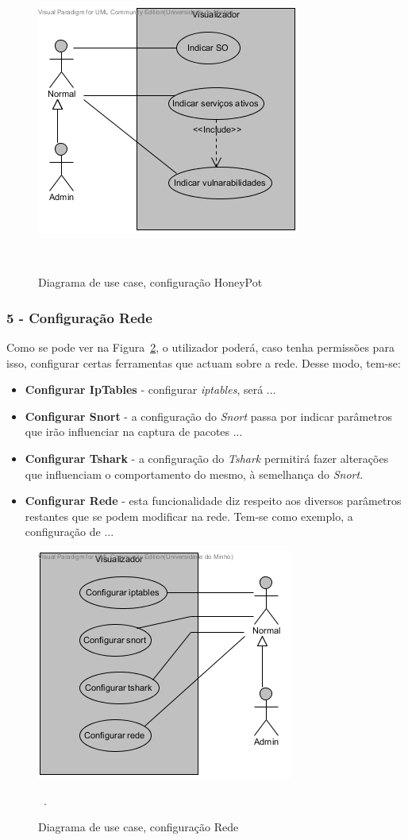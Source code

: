 \begin{figure}[!ht]
	\centering
	\includegraphics[scale=0.80]{images/ucs/ConfHoneyPot}
	\caption {Diagrama de use case, configuração HoneyPot}~\label{fig: confighoney}
\end{figure}
\pagebreak

\subsubsection{\textbf{5 - Configuração Rede}}
Como se pode ver na Figura~\ref{fig: confrede}, o utilizador poderá, caso tenha permissões para isso, configurar certas ferramentas que actuam sobre a rede. Desse modo, tem-se:

\begin{itemize}
 \item \textbf{Configurar IpTables} - configurar \emph{iptables}, será ...
 \item \textbf{Configurar Snort} - a configuração do \emph{Snort} passa por indicar parâmetros que irão influenciar na captura de pacotes ...
 \item \textbf{Configurar Tshark} - a configuração do \emph{Tshark} permitirá fazer alterações que influenciam o comportamento do mesmo, à semelhança do \emph{Snort}.
 \item \textbf{Configurar Rede} - esta funcionalidade diz respeito aos diversos parâmetros restantes que se podem modificar na rede. Tem-se como exemplo, a configuração de ...
\end{itemize}

\begin{figure}[!ht]
\centering
\includegraphics[scale=0.80]{images/ucs/ConfRede}
\caption {Diagrama de use case, configuração Rede}~\label{fig: confrede}.
\end{figure}
\pagebreak


